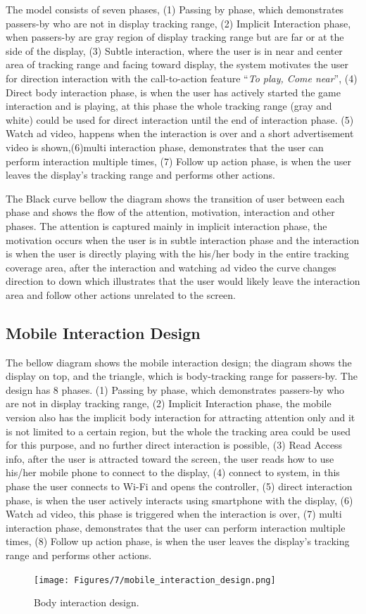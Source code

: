 The model consists of seven phases, (1) Passing by phase, which demonstrates passers-by who are not in display tracking range, (2) Implicit Interaction phase, when passers-by are gray region of display tracking range but are far or at the side of the display, (3) Subtle interaction, where the user is in near and center area of tracking range and facing toward display, the system motivates the user for direction interaction with the call-to-action feature ``\emph{To play, Come near}'', (4) Direct body interaction phase, is when the user has actively started the game interaction and is playing, at this phase the whole tracking range (gray and white) could be used for direct interaction until the end of interaction phase. (5) Watch ad video, happens when the interaction is over and a short advertisement video is shown,(6)multi interaction phase, demonstrates that the user can perform interaction multiple times, (7) Follow up action phase, is when the user leaves the display’s tracking range and performs other actions.

The Black curve bellow the diagram shows the transition of user between each phase and shows the flow of the attention, motivation, interaction and other phases. The attention is captured mainly in implicit interaction phase, the motivation occurs when the user is in subtle interaction phase and the interaction is when the user is directly playing with the his/her body in the entire tracking coverage area, after the interaction and watching ad video the curve changes direction to down which illustrates that the user would likely leave the interaction area and follow other actions unrelated to the screen. 



\subsection{Mobile Interaction Design}
The bellow diagram shows the mobile interaction design; the diagram shows the display on top, and the triangle, which is body-tracking range for passers-by. The design has 8 phases. (1) Passing by phase, which demonstrates passers-by who are not in display tracking range, (2) Implicit Interaction phase, the mobile version also has the implicit body interaction for attracting attention only and it is not limited to a certain region, but the whole the tracking area could be used for this purpose, and no further direct interaction is possible, (3) Read Access info, after the user is attracted toward the screen, the user reads how to use his/her mobile phone to connect to the display, (4) connect to system, in this phase the user connects to Wi-Fi and opens the controller, (5) direct interaction phase, is when the user actively interacts using smartphone with the display, (6) Watch ad video, this phase is triggered when the interaction is over, (7) multi interaction phase, demonstrates that the user can perform interaction multiple times, (8) Follow up action phase, is when the user leaves the display’s tracking range and performs other actions.

\begin{figure}[H]
    \centering
    \texttt{[image: Figures/7/mobile\_interaction\_design.png]}
    \caption{Body interaction design.}%
    \label{fig:body_interaction_deisng}%
\end{figure}






